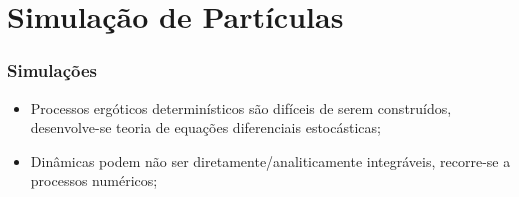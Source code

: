 

\section{Simulação de Partículas}

\begin{frame}
	\frametitle{Simulações}
	
	\begin{itemize}
		\item Processos ergóticos determinísticos são difíceis de serem construídos, desenvolve-se teoria de equações diferenciais estocásticas;
		\pause
		\item Dinâmicas podem não ser diretamente/analiticamente integráveis, recorre-se a processos numéricos;
		\pause
	\end{itemize}
\end{frame}

